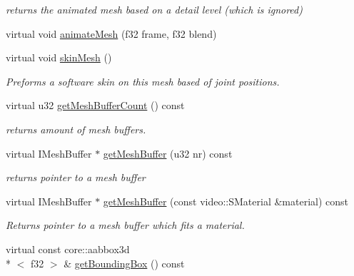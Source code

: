 \begin{DoxyCompactItemize}
\begin{DoxyCompactList}\small\item\em returns the animated mesh based on a detail level (which is ignored) \end{DoxyCompactList}\item 
virtual void \hyperlink{classirr_1_1scene_1_1_c_skinned_mesh_a5b33b20f1baf826eb491ccf5a5246253}{animate\-Mesh} (f32 frame, f32 blend)
\item 
\hypertarget{classirr_1_1scene_1_1_c_skinned_mesh_afe6d606859aff64c7c6c7a1c3546e896}{virtual void \hyperlink{classirr_1_1scene_1_1_c_skinned_mesh_afe6d606859aff64c7c6c7a1c3546e896}{skin\-Mesh} ()}\label{classirr_1_1scene_1_1_c_skinned_mesh_afe6d606859aff64c7c6c7a1c3546e896}

\begin{DoxyCompactList}\small\item\em Preforms a software skin on this mesh based of joint positions. \end{DoxyCompactList}\item 
\hypertarget{classirr_1_1scene_1_1_c_skinned_mesh_a85d14215acadf6574832b19db046eb59}{virtual u32 \hyperlink{classirr_1_1scene_1_1_c_skinned_mesh_a85d14215acadf6574832b19db046eb59}{get\-Mesh\-Buffer\-Count} () const }\label{classirr_1_1scene_1_1_c_skinned_mesh_a85d14215acadf6574832b19db046eb59}

\begin{DoxyCompactList}\small\item\em returns amount of mesh buffers. \end{DoxyCompactList}\item 
\hypertarget{classirr_1_1scene_1_1_c_skinned_mesh_a91eaa56889ae48b6dd00dec1d8f00d68}{virtual I\-Mesh\-Buffer $\ast$ \hyperlink{classirr_1_1scene_1_1_c_skinned_mesh_a91eaa56889ae48b6dd00dec1d8f00d68}{get\-Mesh\-Buffer} (u32 nr) const }\label{classirr_1_1scene_1_1_c_skinned_mesh_a91eaa56889ae48b6dd00dec1d8f00d68}

\begin{DoxyCompactList}\small\item\em returns pointer to a mesh buffer \end{DoxyCompactList}\item 
virtual I\-Mesh\-Buffer $\ast$ \hyperlink{classirr_1_1scene_1_1_c_skinned_mesh_aaee0779795ec84d55c2a5d5a3c3b9d62}{get\-Mesh\-Buffer} (const video\-::\-S\-Material \&material) const 
\begin{DoxyCompactList}\small\item\em Returns pointer to a mesh buffer which fits a material. \end{DoxyCompactList}\item 
\hypertarget{classirr_1_1scene_1_1_c_skinned_mesh_a7a4ebd8cee652720e109801a8654eb7d}{virtual const core\-::aabbox3d\\*
$<$ f32 $>$ \& \hyperlink{classirr_1_1scene_1_1_c_skinned_mesh_a7a4ebd8cee652720e109801a8654eb7d}{get\-Bounding\-Box} () const }\label{classirr_1_1scene_1_1_c_skinned_mesh_a7a4ebd8cee652720e109801a8654eb7d}


\end{DoxyCompactItemize}
